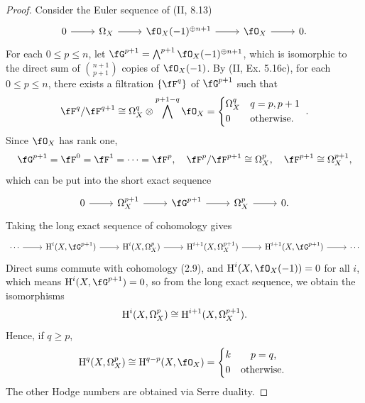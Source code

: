 \documentclass[a4paper]{article}
\begin{document}
\begin{enumerate} [label=\textbf{\arabic*.}, leftmargin=0em]
        \begin{proof}
          Consider the Euler sequence of (II, 8.13)
          \[ \begin{tikzcd}
              0 \arrow[r] & \Omega_X \arrow[r] & \fO_X(-1)^{\oplus n + 1} \arrow[r] & \fO_X \arrow[r] & 0.
            \end{tikzcd} \]
          For each $0 \leq p \leq n$, let $\fG^{p + 1} = \bigwedge^{p + 1} \fO_X(-1)^{\oplus n + 1}$, which is isomorphic to the direct sum of ${n + 1 \choose p + 1}$ copies of $\fO_X(-1)$.
          By (II, Ex. 5.16c), for each $0 \leq p \leq n$, there exists a filtration $\{ \fF^q\}$ of $\fG^{p + 1}$ such that
          \begin{equation*}
            \fF^q / \fF^{q + 1} \cong \Omega_X^q \otimes \bigwedge^{p + 1 - q} \fO_X = \begin{cases*}
              \Omega_X^q & $q = p, p + 1$ \\
              0          & otherwise.
            \end{cases*}.
          \end{equation*}
          Since $\fO_X$ has rank one,
          \begin{equation*}
            \fG^{p + 1} = \fF^0 = \fF^1 = \cdots = \fF^p, \quad \fF^p / \fF^{p + 1} \cong \Omega_X^p, \quad \fF^{p + 1} \cong \Omega_X^{p + 1},
          \end{equation*}
          which can be put into the short exact sequence
          \[ \begin{tikzcd}
              0 \arrow[r] & \Omega_X^{p + 1} \arrow[r] & \fG^{p + 1} \arrow[r] & \Omega_X^p \arrow[r] & 0.
            \end{tikzcd} \]
          Taking the long exact sequence of cohomology gives
          \[ \begin{tikzcd}
              \cdots \arrow[r] & {\cH^i(X, \fG^{p + 1})} \arrow[r] & {\cH^i(X, \Omega_X^{p})} \arrow[r] & {\cH^{i + 1}(X, \Omega_X^{p + 1})} \arrow[r] & {\cH^{i+1}(X, \fG^{p + 1})} \arrow[r] & \cdots
            \end{tikzcd} \]
          Direct sums commute with cohomology (2.9), and $\cH^i(X, \fO_X(-1)) = 0$ for all $i$, which means $\cH^i(X, \fG^{p + 1}) = 0$, so from the long exact sequence, we obtain the isomorphisms
          \begin{equation*}
            \operatorname{H}^i(X, \Omega_X^p) \cong \operatorname{H}^{i + 1}(X, \Omega_X^{p + 1}).
          \end{equation*}
          Hence, if $q \geq p$,
          \begin{equation*}
            \cH^q(X, \Omega_X^p) \cong \cH^{q - p}(X, \fO_X) = \begin{cases*}
              k & \quad $p = q$, \\
              0 & otherwise.
            \end{cases*}
          \end{equation*}
          The other Hodge numbers are obtained via Serre duality.
        \end{proof}


\end{enumerate}
\end{document}

